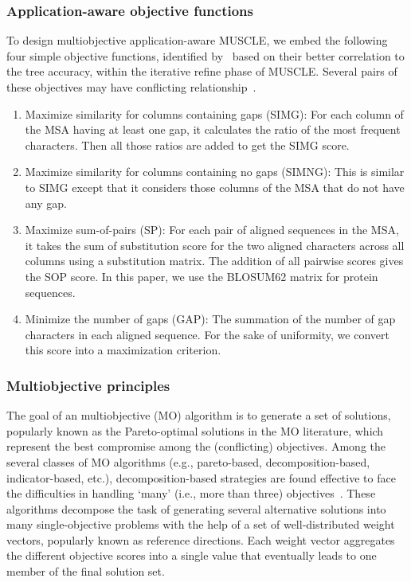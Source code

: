 \subsubsection{Application-aware objective functions}
To design multiobjective application-aware MUSCLE, we embed the following four simple objective functions, identified by~\cite{nayeem2020multiobjective} based on their better correlation to the tree accuracy, within the iterative refine phase of MUSCLE. Several pairs of these objectives may have conflicting relationship~\cite{nayeem2020multiobjective}.  
\begin{enumerate}
	\item Maximize similarity for columns containing gaps (SIMG): For each column of the MSA having at least one gap, it calculates the ratio of the most frequent characters. Then all those ratios are added to get the SIMG score.
	\item Maximize similarity for columns containing no gaps (SIMNG): This is similar to SIMG except that it considers those columns of the MSA that do not have any gap.
	\item Maximize sum-of-pairs (SP): For each pair of aligned sequences in the MSA, it takes the sum of substitution score for the two aligned characters across all columns using a substitution matrix. The addition of all pairwise scores gives the SOP score. In this paper, we use the BLOSUM62 matrix for protein sequences.
	\item Minimize the number of gaps (GAP): The summation of the number of gap characters in each aligned sequence. For the sake of uniformity, we convert this score into a maximization criterion.
\end{enumerate}


\subsubsection{Multiobjective principles}
The goal of an multiobjective (MO) algorithm is to generate a set of solutions, popularly known as the Pareto-optimal solutions in the MO literature, which represent the best compromise among the (conflicting) objectives. 
Among the several classes of MO algorithms (e.g., pareto-based, decomposition-based, indicator-based, etc.), decomposition-based strategies are found effective to face the difficulties in handling `many' (i.e., more than three) objectives~\cite{li2015many}. These algorithms decompose the task of generating several alternative solutions into many single-objective problems with the help of a set of well-distributed weight vectors, popularly known as reference directions. Each weight vector aggregates the different objective scores into a single value that eventually leads to one member of the final solution set.

